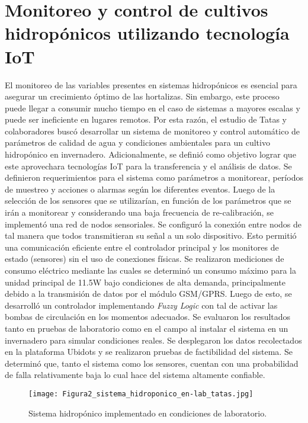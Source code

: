 \section{Monitoreo y control de cultivos hidropónicos utilizando tecnología IoT}
El monitoreo de las variables presentes en sistemas hidropónicos es esencial para asegurar un crecimiento óptimo de las hortalizas. Sin embargo, este proceso puede llegar a consumir mucho tiempo en el caso de sistemas a mayores escalas y puede ser ineficiente en lugares remotos. Por esta razón, el estudio de Tatas y colaboradores \cite{tatas_reliable_2022} buscó desarrollar un sistema de monitoreo y control automático de parámetros de calidad de agua y condiciones ambientales para un cultivo hidropónico en invernadero. Adicionalmente, se definió como objetivo lograr que este aprovechara tecnologías IoT para la transferencia y el análisis de datos. Se definieron requerimientos para el sistema como parámetros a monitorear, períodos de muestreo y acciones o alarmas según los diferentes eventos. Luego de la selección de los sensores que se utilizarían, en función de los parámetros que se irán a monitorear y considerando una baja frecuencia de re-calibración, se implementó una red de nodos sensoriales. Se configuró la conexión entre nodos de tal manera que todos transmitieran su señal a un solo dispositivo. Esto permitió una comunicación eficiente entre el controlador principal y los monitores de estado (sensores) sin el uso de conexiones físicas. Se realizaron mediciones de consumo eléctrico mediante las cuales se determinó un consumo máximo para la unidad principal de 11.5W bajo condiciones de alta demanda, principalmente debido a la transmisión de datos por el módulo GSM/GPRS. Luego de esto, se desarrolló un controlador implementando \textit{Fuzzy Logic} con tal de activar las bombas de circulación en los momentos adecuados. Se evaluaron los resultados tanto en pruebas de laboratorio como en el campo al instalar el sistema en un invernadero para simular condiciones reales. Se desplegaron los datos recolectados en la plataforma Ubidots y se realizaron pruebas de factibilidad del sistema. Se determinó que, tanto el sistema como los sensores, cuentan con una probabilidad de falla relativamente baja lo cual hace del sistema altamente confiable. 

\begin{figure}[H]
	\centering
	\texttt{[image: Figura2\_sistema\_hidroponico\_en-lab\_tatas.jpg]}
	\caption{Sistema hidropónico implementado en condiciones de laboratorio.}
	\label{fig:mesh4}
\end{figure}


